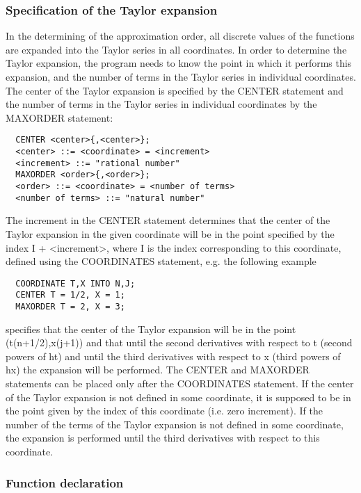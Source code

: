 \subsubsection{Specification of the Taylor expansion}

     In the  determining of the approximation order, all discrete values
of the functions are expanded into the Taylor series in all coordinates.
In order  to determine  the Taylor  expansion, the program needs to know
the point in which it performs this expansion,  and the  number of terms
in the Taylor series in individual coordinates. The center of the Taylor
expansion is specified by the CENTER statement and  the number  of terms
in  the   Taylor  series  in  individual  coordinates  by  the  MAXORDER
statement:
\begin{verbatim}
  CENTER <center>{,<center>};
  <center> ::= <coordinate> = <increment>
  <increment> ::= "rational number"
  MAXORDER <order>{,<order>};
  <order> ::= <coordinate> = <number of terms>
  <number of terms> ::= "natural number"
\end{verbatim}
The increment in the CENTER statement determines that the center  of the
Taylor expansion  in the given coordinate will be in the point specified
by the index I + <increment>, where I is the index corresponding to this
coordinate, defined  using the COORDINATES statement, e.g. the following
example
\begin{verbatim}
  COORDINATE T,X INTO N,J;
  CENTER T = 1/2, X = 1;
  MAXORDER T = 2, X = 3;
\end{verbatim}
specifies that the center of the Taylor expansion  will be  in the point
(t(n+1/2),x(j+1)) and  that until the second derivatives with respect to
t (second powers of ht) and until the third derivatives  with respect to
x (third  powers of  hx) the expansion will be performed. The CENTER and
MAXORDER statements can be placed only after the  COORDINATES statement.
If the center of the Taylor expansion is not defined in some coordinate,
it is supposed to be in the point given by the index  of this coordinate
(i.e.  zero  increment).  If  the  number  of  the  terms  of the Taylor
expansion is not defined in some coordinate, the  expansion is performed
until the third derivatives with respect to this coordinate.


\subsubsection{Function declaration}


